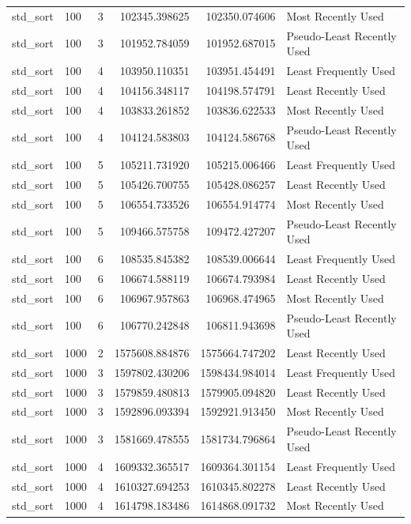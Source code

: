 \begin{tabular}{llrrrl}
std_sort & 100 & 3 & 102345.398625 & 102350.074606 & Most Recently Used \\
std_sort & 100 & 3 & 101952.784059 & 101952.687015 & Pseudo-Least Recently Used \\
std_sort & 100 & 4 & 103950.110351 & 103951.454491 & Least Frequently Used \\
std_sort & 100 & 4 & 104156.348117 & 104198.574791 & Least Recently Used \\
std_sort & 100 & 4 & 103833.261852 & 103836.622533 & Most Recently Used \\
std_sort & 100 & 4 & 104124.583803 & 104124.586768 & Pseudo-Least Recently Used \\
std_sort & 100 & 5 & 105211.731920 & 105215.006466 & Least Frequently Used \\
std_sort & 100 & 5 & 105426.700755 & 105428.086257 & Least Recently Used \\
std_sort & 100 & 5 & 106554.733526 & 106554.914774 & Most Recently Used \\
std_sort & 100 & 5 & 109466.575758 & 109472.427207 & Pseudo-Least Recently Used \\
std_sort & 100 & 6 & 108535.845382 & 108539.006644 & Least Frequently Used \\
std_sort & 100 & 6 & 106674.588119 & 106674.793984 & Least Recently Used \\
std_sort & 100 & 6 & 106967.957863 & 106968.474965 & Most Recently Used \\
std_sort & 100 & 6 & 106770.242848 & 106811.943698 & Pseudo-Least Recently Used \\
std_sort & 1000 & 2 & 1575608.884876 & 1575664.747202 & Least Recently Used \\
std_sort & 1000 & 3 & 1597802.430206 & 1598434.984014 & Least Frequently Used \\
std_sort & 1000 & 3 & 1579859.480813 & 1579905.094820 & Least Recently Used \\
std_sort & 1000 & 3 & 1592896.093394 & 1592921.913450 & Most Recently Used \\
std_sort & 1000 & 3 & 1581669.478555 & 1581734.796864 & Pseudo-Least Recently Used \\
std_sort & 1000 & 4 & 1609332.365517 & 1609364.301154 & Least Frequently Used \\
std_sort & 1000 & 4 & 1610327.694253 & 1610345.802278 & Least Recently Used \\
std_sort & 1000 & 4 & 1614798.183486 & 1614868.091732 & Most Recently Used \\

\end{tabular}
